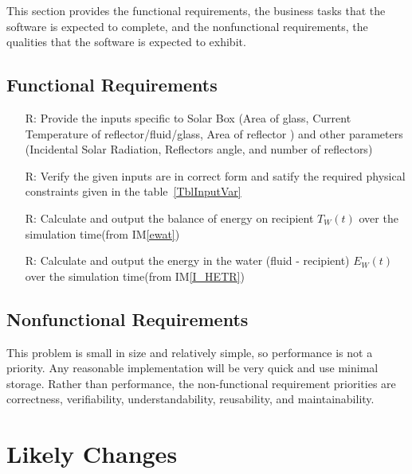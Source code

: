 \documentclass[12pt]{article}
\newcommand{\iref}[1]{IM\ref{#1}}
\newcounter{reqnum} %
\begin{document}
This section provides the functional requirements, the business tasks that the
software is expected to complete, and the nonfunctional requirements, the
qualities that the software is expected to exhibit.

\subsection{Functional Requirements}

\noindent \begin{itemize}

\item[R\refstepcounter{reqnum}\thereqnum \label{R_Inputs}:] Provide the inputs specific to Solar Box (Area of glass, Current Temperature of reflector/fluid/glass, Area of reflector ) and other parameters (Incidental Solar Radiation, Reflectors angle, and number of reflectors)

\item[R\refstepcounter{reqnum}\thereqnum \label{R_VerifyOutput}:]
  Verify the given inputs are in correct form and satify the required physical constraints given in the table~\ref{TblInputVar}

\item[R\refstepcounter{reqnum}\thereqnum \label{R_Calculate}:] Calculate and output the balance of energy on recipient $T_W(t)$ over the simulation time(from \iref{ewat})

\item[R\refstepcounter{reqnum}\thereqnum \label{R_Output}:] Calculate and output the energy in the water (fluid - recipient) $E_W(t)$ over the simulation time(from \iref{I_HETR})

\end{itemize}


\subsection{Nonfunctional Requirements}


\noindent 

This problem is small in size and relatively simple, so performance is not a priority. Any reasonable implementation will be very quick and use minimal storage. Rather than performance, the non-functional requirement priorities are correctness, verifiability, understandability, reusability, and maintainability. 
 


\section{Likely Changes}    
\end{document}
